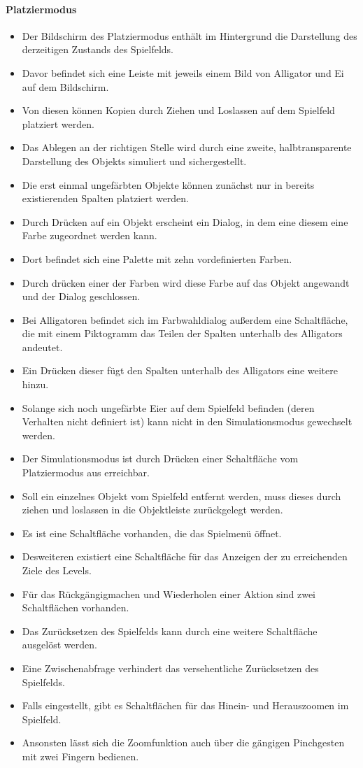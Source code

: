 \paragraph{Platziermodus}\mbox{}\newline
\begin{itemize}
\item Der Bildschirm des Platziermodus enthält im Hintergrund die Darstellung
des derzeitigen Zustands des Spielfelds.
\item Davor befindet sich eine Leiste mit jeweils einem Bild von Alligator und Ei auf dem Bildschirm.
\item Von diesen können Kopien durch Ziehen und Loslassen auf dem Spielfeld platziert werden. 
\item Das Ablegen an der richtigen Stelle wird durch eine zweite, 
halbtransparente Darstellung des Objekts simuliert und sichergestellt. 
\item Die erst einmal ungefärbten Objekte können zunächst nur in bereits 
existierenden Spalten platziert werden.
\item  Durch Drücken auf ein Objekt erscheint 
ein Dialog, in dem eine diesem eine Farbe zugeordnet werden kann.
\item Dort befindet sich eine Palette mit zehn vordefinierten Farben.
\item Durch drücken einer der Farben wird diese Farbe auf das Objekt angewandt und der Dialog geschlossen.
\item Bei Alligatoren befindet sich im Farbwahldialog außerdem eine Schaltfläche, die mit einem
Piktogramm das Teilen der Spalten unterhalb des Alligators andeutet.
\item Ein Drücken dieser fügt den Spalten unterhalb des Alligators eine weitere hinzu.
\item Solange sich noch ungefärbte Eier auf dem Spielfeld befinden (deren Verhalten
nicht definiert ist) kann nicht in den Simulationsmodus gewechselt werden.
\item Der Simulationsmodus ist durch Drücken einer Schaltfläche vom Platziermodus
aus erreichbar.
\item Soll ein einzelnes Objekt vom Spielfeld entfernt werden, muss dieses durch ziehen und loslassen
in die Objektleiste zurückgelegt werden.
\item Es ist eine Schaltfläche vorhanden, die das Spielmenü öffnet.
\item Desweiteren existiert eine Schaltfläche für das Anzeigen der zu erreichenden Ziele des Levels.
\item Für das Rückgängigmachen und Wiederholen einer Aktion sind zwei Schaltflächen vorhanden.
\item Das Zurücksetzen des Spielfelds kann durch eine weitere Schaltfläche ausgelöst werden.
\item Eine Zwischenabfrage verhindert das versehentliche Zurücksetzen des Spielfelds.
\item Falls eingestellt, gibt es Schaltflächen für das Hinein- und Herauszoomen im Spielfeld.
\item Ansonsten lässt sich die Zoomfunktion auch über die gängigen Pinchgesten mit zwei Fingern bedienen.
\end{itemize}

